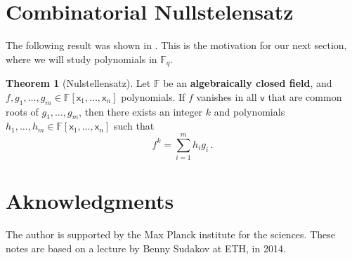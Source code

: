 \documentclass[12pt]{amsart}
\theoremstyle{definition}
\newtheorem{thm}{Theorem}[section]
\newcommand{\F}{\mathbb{F}}
\newcommand{\vv}{\mathsf{v}}
\newcommand{\vx}{\mathsf{x}}
\begin{document}
\section{Combinatorial Nullstelensatz}


The following result was shown in \cite{hilbert1893ueber}.
This is the motivation for our next section, where we will study polynomials in $\F_q$.

\begin{thm}[Nulstellensatz]
Let $\F$ be an \textbf{algebraically closed field}, and $f, g_1, \ldots, g_m\in \F[\vx_1, \ldots, \vx_n]$ polynomials.
If $f$ vanishes in all $\vv$ that are common roots of $g_1, \ldots, g_m$, then there exists an integer $k$ and polynomials $h_1, \ldots, h_m \in \F[\vx_1, \ldots, \vx_n]$ such that
$$ f^k = \sum_{i=1}^m h_i g_i \, . $$
\end{thm}




\section*{Aknowledgments}
The author is supported by the Max Planck institute for the sciences. 
These notes are based on a lecture by Benny Sudakov at ETH, in 2014.



\end{document}
